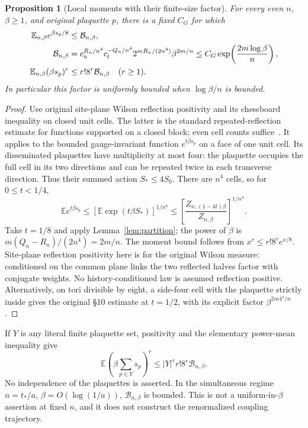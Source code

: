 \documentclass[11pt,letterpaper]{article}
\theoremstyle{plain}
\newtheorem{proposition}[theorem]{Proposition}
\theoremstyle{remark}\newtheorem{remark}[theorem]{Scope}
\newcommand{\E}{\mathbb E}\newcommand{\R}{\mathbb R}
\begin{document}
\begin{proposition}[Local moments with their finite-size factor]
\label{prop:moments}
For every even $n$, $\beta\ge1$, and original plaquette $p$, there is a fixed
$C_G$ for which
\begin{align}
\E_{n,\beta}e^{\beta s_p/8}&\le\mathcal B_{n,\beta},\notag\\
\mathcal B_{n,\beta}
&=c_u^{R_n/n^4}c_l^{-Q_n/n^4}
2^{mR_n/(2n^4)}\beta^{2m/n}
\le C_G\exp\!\left(\frac{2m\log\beta}{n}\right),\label{eq:B}\\
\E_{n,\beta}(\beta s_p)^r&\le r!8^r\mathcal B_{n,\beta}
\quad(r\ge1).
\label{eq:moment}
\end{align}
In particular this factor is uniformly bounded when $\log\beta/n$ is bounded.
\end{proposition}
\begin{proof}
Use original site-plane Wilson reflection positivity and its chessboard inequality
on closed unit cells. The latter is the standard repeated-reflection estimate
for functions supported on a closed block; even cell counts suffice~\cite{biskup}.
It applies to the bounded gauge-invariant function $e^{t\beta s_p}$ on a face of
one unit cell. Its disseminated plaquettes have multiplicity at most four: the
plaquette occupies the full cell in its two directions and can be repeated twice
in each transverse direction. Thus their summed action $S_*\le4S_0$.
There are $n^4$ cells, so for $0\le t<1/4$,
\[
\E e^{t\beta s_p}
\le\left[\E\exp(t\beta S_*)\right]^{1/n^4}
\le\left[\frac{Z_{n,(1-4t)\beta}}{Z_{n,\beta}}\right]^{1/n^4}.
\]
Take $t=1/8$ and apply Lemma~\ref{lem:partition}; the power of $\beta$ is
$m(Q_n-R_n)/(2n^4)=2m/n$. The moment bound follows from
$x^r\le r!8^r e^{x/8}$. Site-plane reflection positivity here is for the original
Wilson measure: conditioned on the common plane links the two reflected halves
factor with conjugate weights. No history-conditioned law is assumed reflection
positive. Alternatively, on tori divisible by eight, a side-four cell with the
plaquette strictly inside gives the original \S10 estimate at $t=1/2$, with its
explicit factor $\beta^{2m4^4/n}$.
\end{proof}

If $Y$ is any literal finite plaquette set, positivity and the elementary power-mean
inequality give
\begin{equation}
\E\left(\beta\sum_{p\in Y}s_p\right)^r
\le |Y|^r r!8^r\mathcal B_{n,\beta}.
\label{eq:patchmoment}
\end{equation}
No independence of the plaquettes is asserted. In the simultaneous regime
$n=t_*/a$, $\beta=O(\log(1/a))$, $\mathcal B_{n,\beta}$ is bounded. This is
not a uniform-in-$\beta$ assertion at fixed $n$, and it does not construct the
renormalized coupling trajectory.
\end{document}
